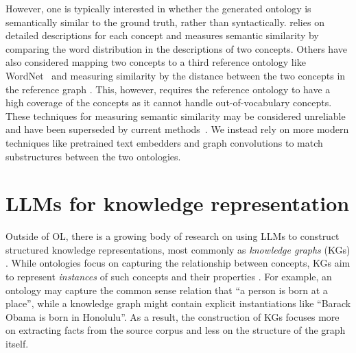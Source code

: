 However, one is typically interested in whether the generated ontology is semantically similar to the ground truth, rather than syntactically. \citet{Zavitsanos2011GoldSE} relies on detailed descriptions for each concept and measures semantic similarity by comparing the word distribution in the descriptions of two concepts. Others have also considered mapping two concepts to a third reference ontology like WordNet~\cite{maedche2002measuring} and measuring similarity by the distance between the two concepts in the reference graph \cite{Treeratpituk2013GraphbasedAT}. This, however, requires the reference ontology to have a high coverage of the concepts as it cannot handle out-of-vocabulary concepts. These techniques for measuring semantic similarity may be considered unreliable and have been superseded by current methods~\cite{conneau2017supervised}. We instead rely on more modern techniques like pretrained text embedders \cite{devlin2018bert} and graph convolutions \cite{kipf2016semi} to match substructures between the two ontologies.

\section{LLMs for knowledge representation}  \label{sec:LLMs-for-knowledge-representationl}

Outside of OL, there is a growing body of research on using LLMs to construct structured knowledge representations, most commonly as \emph{knowledge graphs} (KGs) \cite{singhal2012introducing}. While ontologies focus on capturing the relationship between concepts, KGs aim to represent \emph{instances} of such concepts and their properties \cite{guarino1995ontologies}. For example, an ontology may capture the common sense relation that ``a person is born at a place'', while a knowledge graph might contain explicit instantiations like ``Barack Obama is born in Honolulu''. As a result, the construction of KGs focuses more on extracting facts from the source corpus and less on the structure of the graph itself.

